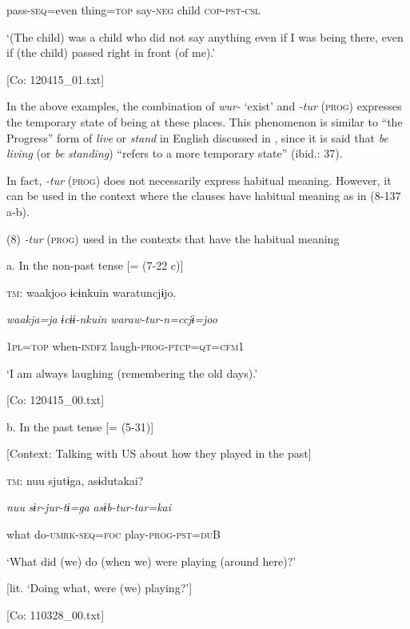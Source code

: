       pass-\textsc{seq}=even  thing=\textsc{top}  say-\textsc{neg}  child  \textsc{cop}-\textsc{pst}-\textsc{csl}

      ‘(The child) was a child who did not say anything even if I was being there, even if (the child) passed right in front (of me).’

      [Co: 120415\_01.txt]

In the above examples, the combination of \textit{wur-} ‘exist’ and \textit{{}-tur} (\textsc{prog}) expresses the temporary state of being at these places. This phenomenon is similar to “the Progress” form of \textit{live} or \textit{stand} in English discussed in \citet{Comrie1976}, since it is said that \textit{be} \textit{living} (or \textit{be} \textit{standing}) “refers to a more temporary state” (ibid.: 37).

  In fact, \textit{{}-tur} (\textsc{prog}) does not necessarily express habitual meaning. However, it can be used in the context where the clauses have habitual meaning as in (8-137 a-b).

(8)  \textit{{}-tur} (\textsc{prog}) used in the contexts that have the habitual meaning

  a.  In the non-past tense [= (7-22 c)]

    \textsc{tm}:  waakjoo  ɨcɨnkuin  waratuncjɨjo.

      \textit{waakja=ja}  \textit{ɨcɨɨ-nkuin}  \textit{waraw-tur{}-n=ccjɨ=joo}

      1\textsc{pl}=\textsc{top}  when-\textsc{indfz}  laugh-\textsc{prog}-\textsc{ptcp}=\textsc{qt}=\textsc{cfm}1

      ‘I am always laughing (remembering the old days).’

      [Co: 120415\_00.txt]

  b.  In the past tense [= (5-31)]

    [Context: Talking with US about how they played in the past]

    \textsc{tm}:  nuu  sjutɨga,  asɨdutakai?

      \textit{nuu}  \textit{sɨr-jur-tɨ=ga}  \textit{asɨb-tur{}-tar=kai}

      what  do-\textsc{umrk}-\textsc{seq}=\textsc{foc}  play-\textsc{prog}-\textsc{pst}=\textsc{du}B

      ‘What did (we) do (when we) were playing (around here)?’

[lit. ‘Doing what, were (we) playing?’]

      [Co: 110328\_00.txt]

